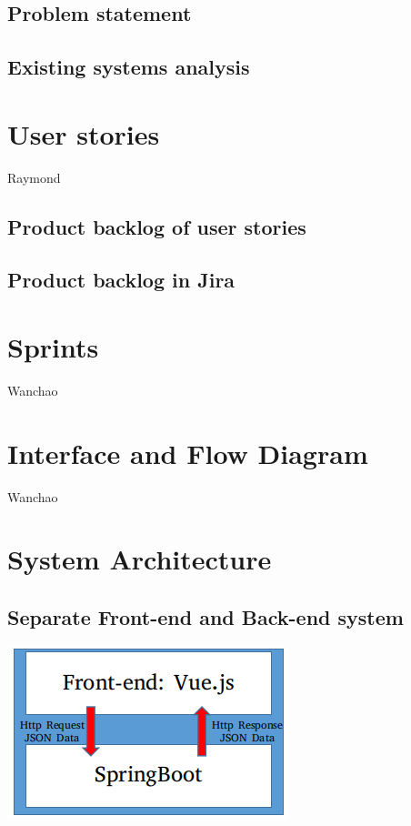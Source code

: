 \documentclass[12pt]{article}
\begin{document}
\subsection{Problem statement}
\subsection{Existing systems analysis}

\newpage
\section{User stories}
Raymond
\subsection{Product backlog of user stories}
\subsection{Product backlog in Jira}

\newpage
\section{Sprints}
Wanchao

\newpage
\section{Interface and Flow Diagram}
Wanchao

\newpage
\section{System Architecture}
\paragraph{}
\subsection{Separate Front-end and Back-end system}
\centerline{\includegraphics[scale = 0.5]{pic/g1.png}}
\end{document}
